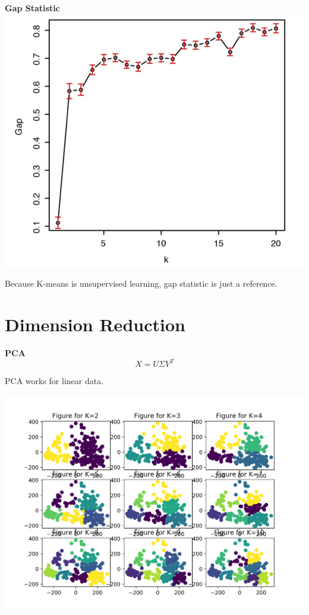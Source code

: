 \documentclass[12pt]{beamer}
\begin{document}
\begin{frame}{\textbf{Gap Statistic}}
\includegraphics[scale=0.25]{fig2/gap3.png}

Because K-means is unsupervised learning, gap statistic is just a reference.
\end{frame}






\section{Dimension Reduction}
\begin{frame}{\textbf{PCA}}
\[X=U\Sigma V^T\]

PCA works for linear data.

\centering
\includegraphics[scale=0.4]{fig2/pca.png}
\end{frame}
\end{document}
